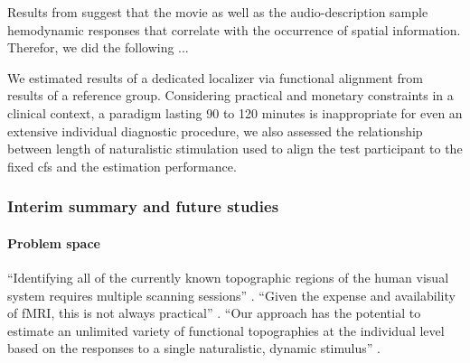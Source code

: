 %
Results from \citet{haeusler2022processing} suggest that the movie as well as
the audio-description sample hemodynamic responses that correlate with the
occurrence of spatial information.
%
Therefor, we did the following ...

We estimated results of a dedicated localizer \citep{sengupta2016extension} via
functional alignment from results of a reference group.
Considering practical and monetary constraints in a clinical context, a paradigm
lasting 90 to 120 minutes is inappropriate for even an extensive individual
diagnostic procedure, we also assessed the relationship between length of
naturalistic stimulation used to align the test participant to the fixed
\ac{cfs} and the estimation performance.



\subsubsection{Interim summary and future studies}






\paragraph{Problem space}

%
``Identifying all of the currently known topographic regions of the human visual
system requires multiple scanning sessions'' \citep{wang2015probabilistic}.
%
``Given the expense and availability of fMRI, this is not always practical''
\citep{wang2015probabilistic}.
%
``Our approach has the potential to estimate an unlimited variety of functional
topographies at the individual level based on the responses to a single
naturalistic, dynamic stimulus'' \citep{jiahui2020predicting}.


